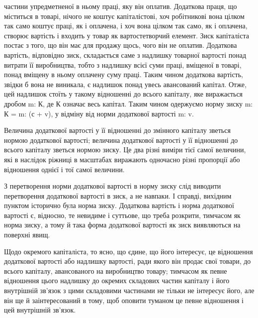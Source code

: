\parcont{}  %
частини упредметненої в ньому праці, яку він оплатив. Додаткова
праця, що міститься в товарі, нічого не коштує капіталістові,
хоч робітникові вона цілком так само коштує праці, як
і оплачена, і хоч вона цілком так само, як і оплачена, створює
вартість і входить у товар як вартостетворчий елемент. Зиск
капіталіста постає з того, що він має для продажу щось, чого
він не оплатив. Додаткова вартість, відповідно зиск, складається
саме з надлишку товарної вартості понад витрати її виробництва,
тобто з надлишку всієї суми праці, вміщеної в товарі, понад
вміщену в ньому оплачену суму праці. Таким чином додаткова
вартість, звідки б вона не виникала, є надлишок понад увесь
авансований капітал. Отже, цей надлишок стоїть у такому відношенні
до всього капіталу, яке виражається дробом m: К, де
К означає весь капітал. Таким чином одержуємо норму зиску
m: К = m: (с + v), у відміну від норми додаткової вартості m: v.

Величина додаткової вартості у її відношенні до змінного
капіталу зветься нормою додаткової вартості; величина додаткової
вартості у її відношенні до всього капіталу зветься нормою зиску.
Це два різні виміри тієї самої величини, які в наслідок ріжниці в
масштабах виражають одночасно різні пропорції або відношення
однієї і тої самої величини.

З перетворення норми додаткової вартості в норму зиску
слід виводити перетворення додаткової вартості в зиск, а не
навпаки. І справді, вихідним пунктом історично була норма зиску.
Додаткова вартість і норма додаткової вартості є, відносно, те
невидиме і суттьове, що треба розкрити, тимчасом як норма
зиску, а тому й така форма додаткової вартості як зиск виявляються
на поверхні явищ.

Щодо окремого капіталіста, то ясно, що єдине, що його
інтересує, це відношення додаткової вартості або надлишку вартості,
ради якого він продає свої товари, до всього капіталу,
авансованого на виробництво товару; тимчасом як певне відношення
цього надлишку до окремих складових частин капіталу
і його внутрішній зв’язок з цими складовими частинами не тільки
не інтересує його, але він ще й заінтересований в тому, щоб
оповити туманом це певне відношення і цей внутрішній зв’язок.

